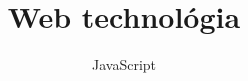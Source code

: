 \documentclass[usenames,dvipsnames,aspectratio=169]{beamer}
\title[Web technológiák - JavaScript]{Web technológia}
\subtitle{JavaScript}
\begin{document}
\begin{frame}[plain]
  \titlepage
  \logoalul
\end{frame}





\end{document}

